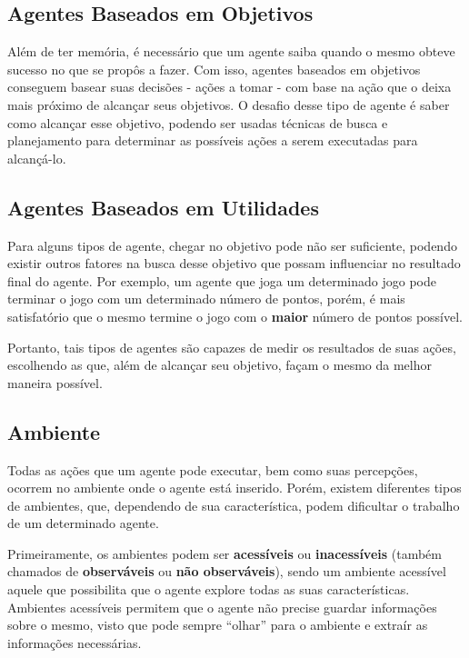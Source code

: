 \subsection{Agentes Baseados em Objetivos}

Além de ter memória, é necessário que um agente saiba quando o mesmo obteve
sucesso no que se propôs a fazer. Com isso, agentes baseados em objetivos
conseguem basear suas decisões - ações a tomar - com base na ação que o deixa
mais próximo de alcançar seus objetivos. O desafio desse tipo de agente é saber
como alcançar esse objetivo, podendo ser usadas técnicas de busca e planejamento
para determinar as possíveis ações a serem executadas para alcançá-lo.

\subsection{Agentes Baseados em Utilidades}

Para alguns tipos de agente, chegar no objetivo pode não ser suficiente, podendo
existir outros fatores na busca desse objetivo que possam influenciar no
resultado final do agente. Por exemplo, um agente que joga um determinado jogo
pode terminar o jogo com um determinado número de pontos, porém, é mais
satisfatório que o mesmo termine o jogo com o \textbf{maior} número de pontos
possível.

Portanto, tais tipos de agentes são capazes de medir os resultados de suas
ações, escolhendo as que, além de alcançar seu objetivo, façam o mesmo da melhor
maneira possível.

\subsection{Ambiente}

Todas as ações que um agente pode executar, bem como suas percepções, ocorrem no
ambiente onde o agente está inserido. Porém, existem diferentes tipos de
ambientes, que, dependendo de sua característica, podem dificultar o trabalho de
um determinado agente.

Primeiramente, os ambientes podem ser \textbf{acessíveis} ou
\textbf{inacessíveis} (também chamados de \textbf{observáveis} ou \textbf{não
observáveis}), sendo um ambiente acessível aquele que possibilita que o agente
explore todas as suas características. Ambientes acessíveis permitem que o
agente não precise guardar informações sobre o mesmo, visto que pode sempre
``olhar'' para o ambiente e extraír as informações necessárias.

